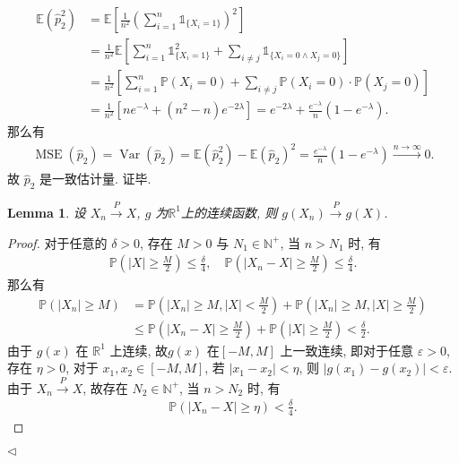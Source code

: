\documentclass[11pt]{article}
\newtheorem{lemma}[theorem]{Lemma}
\newenvironment{answer}[1][Solution]{\begin{trivlist}
    \item[\hskip \labelsep {\bfseries #1.}\hskip \labelsep]}{\hfill$\lhd$\end{trivlist}}
\newcommand\1{\mathds{1}}
\newcommand\R{\mathbb{R}}
\newcommand\E{\mathbb{E}}
\newcommand\N{\mathbb{N}}
\newcommand\PP{\mathbb{P}}
\newcommand{\arrp}{\xrightarrow{P}}
\newcommand{\arri}{\xrightarrow{n\rightarrow\infty}}
\DeclareMathOperator{\Var}{Var}
\DeclareMathOperator{\MSE}{MSE}
\begin{document}
\begin{answer}
\begin{enumerate}[label=(\arabic*)]
        \begin{align*}
            \E\left(\hat{p}_2^2\right) &= \E\left[\frac{1}{n^2}\left(\sum_{i=1}^{n} \1_{\{X_i=1\}}\right)^2\right]  \\
            &= \frac{1}{n^2} \E\left[\sum_{i=1}^{n}\1_{\{X_i=1\}}^2 + \sum_{i\neq j} \1_{\{X_i = 0 \land X_j = 0\}}\right] \\
            &= \frac{1}{n^2} \left[\sum_{i=1}^{n}\PP(X_i = 0) + \sum_{i\neq j} \PP(X_i=0) \cdot \PP(X_j =0)\right] \\
            &= \frac{1}{n^2} \left[n e^{-\lambda} + (n^2 - n) e^{-2\lambda}\right] = e^{-2\lambda} + \frac{e^{-\lambda}}{n}(1 - e^{-\lambda}).
        \end{align*}
        那么有
        \begin{align*}
            \MSE(\hat{p}_2) = \Var(\hat{p}_2) = \E\left(\hat{p}_2^2\right) - \E\left(\hat{p}_2\right)^2 = \frac{e^{-\lambda}}{n} (1 - e^{-\lambda}) \arri 0.
        \end{align*}
        故 $\hat{p}_2$ 是一致估计量. 证毕.
    \end{enumerate}
    \begin{lemma}
        \label{lemma:1}
        设 $X_n \arrp X$, $g$ 为$\R^1$上的连续函数, 则 $g(X_n) \arrp g(X)$.
    \end{lemma}
    \begin{proof}
        对于任意的 $\delta > 0$, 存在 $M > 0$ 与 $N_1 \in \N^+$, 当 $n > N_1$ 时, 有 
        \begin{align*}
            \PP\left(|X| \ge \frac{M}{2}\right) \le \frac{\delta}{4}, \quad\PP\left(|X_n - X| \ge \frac{M}{2}\right) \le \frac{\delta}{4}.
        \end{align*}
        那么有
        \begin{align*}
            \PP(|X_n| \ge M) &= \PP\left(|X_n| \ge M, |X| < \frac{M}{2}\right) + \PP\left(|X_n| \ge M, |X| \ge \frac{M}{2}\right) \\
            &\le \PP\left(|X_n - X| \ge \frac{M}{2}\right) + \PP\left(|X|\ge \frac{M}{2}\right) < \frac{\delta}{2}.
        \end{align*}
        由于 $g(x)$ 在 $\R^1$ 上连续, 故$g(x)$ 在$[-M, M]$ 上一致连续, 即对于任意 $\varepsilon > 0$, 存在 $\eta >0$, 对于 $x_1, x_2 \in [-M, M]$, 
        若 $|x_1 - x_2| < \eta$, 则 $|g(x_1) - g(x_2)| < \varepsilon$. 由于 $X_n \arrp X$, 故存在 $N_2 \in \N^+$, 当 $n > N_2$ 时, 有
        \begin{align*}
            \PP(|X_n - X| \ge \eta) < \frac{\delta}{4}.
        \end{align*}

\end{proof}
\end{answer}
\end{document}
